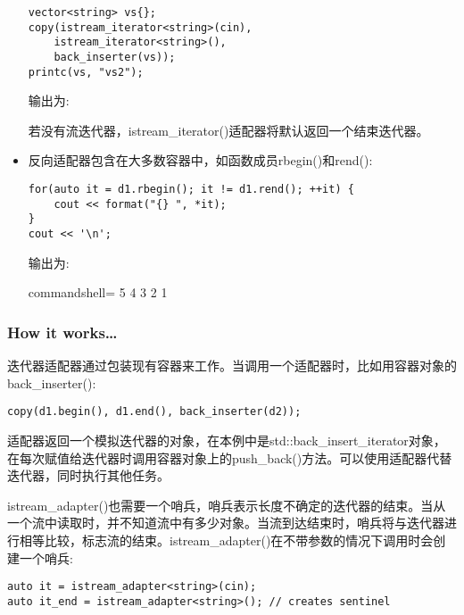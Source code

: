 \begin{itemize}
\begin{lstlisting}[style=styleCXX]
vector<string> vs{};
copy(istream_iterator<string>(cin),
	istream_iterator<string>(),
	back_inserter(vs));
printc(vs, "vs2");
\end{lstlisting}

输出为:


若没有流迭代器，istream\_iterator()适配器将默认返回一个结束迭代器。

\item 
反向适配器包含在大多数容器中，如函数成员rbegin()和rend():

\begin{lstlisting}[style=styleCXX]
for(auto it = d1.rbegin(); it != d1.rend(); ++it) {
	cout << format("{} ", *it);
}
cout << '\n';
\end{lstlisting}

输出为:

\begin{tcblisting}{commandshell={}}
5 4 3 2 1
\end{tcblisting}
\end{itemize}

\subsubsection{How it works…}

迭代器适配器通过包装现有容器来工作。当调用一个适配器时，比如用容器对象的back\_inserter():

\begin{lstlisting}[style=styleCXX]
copy(d1.begin(), d1.end(), back_inserter(d2));
\end{lstlisting}

适配器返回一个模拟迭代器的对象，在本例中是std::back\_insert\_iterator对象，在每次赋值给迭代器时调用容器对象上的push\_back()方法。可以使用适配器代替迭代器，同时执行其他任务。

istream\_adapter()也需要一个哨兵，哨兵表示长度不确定的迭代器的结束。当从一个流中读取时，并不知道流中有多少对象。当流到达结束时，哨兵将与迭代器进行相等比较，标志流的结束。istream\_adapter()在不带参数的情况下调用时会创建一个哨兵:

\begin{lstlisting}[style=styleCXX]
auto it = istream_adapter<string>(cin);
auto it_end = istream_adapter<string>(); // creates sentinel
\end{lstlisting}

